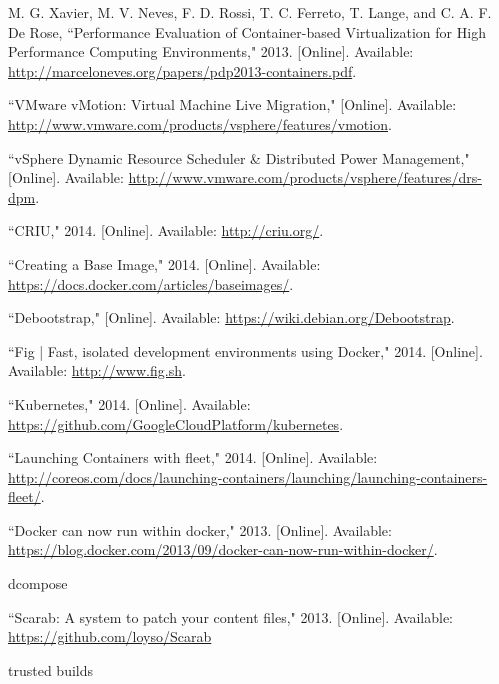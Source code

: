 \begin{thebibliography}{99}
\begin{singlespace}
M. G. Xavier, M. V. Neves, F. D. Rossi, T. C. Ferreto, T. Lange, and C. A. F. De Rose, ``Performance Evaluation of Container-based Virtualization for High Performance Computing Environments," 2013. [Online]. Available: \url{http://marceloneves.org/papers/pdp2013-containers.pdf}.

``VMware vMotion: Virtual Machine Live Migration," [Online]. Available: \url{http://www.vmware.com/products/vsphere/features/vmotion}.

``vSphere Dynamic Resource Scheduler \& Distributed Power Management," [Online]. Available: \url{http://www.vmware.com/products/vsphere/features/drs-dpm}.

``CRIU," 2014. [Online]. Available: \url{http://criu.org/}.

``Creating a Base Image," 2014. [Online]. Available: \url{https://docs.docker.com/articles/baseimages/}.

``Debootstrap," [Online]. Available: \url{https://wiki.debian.org/Debootstrap}.

``Fig | Fast, isolated development environments using Docker," 2014. [Online]. Available: \url{http://www.fig.sh}.

``Kubernetes," 2014. [Online]. Available: \url{https://github.com/GoogleCloudPlatform/kubernetes}.

``Launching Containers with fleet," 2014. [Online]. Available: \url{http://coreos.com/docs/launching-containers/launching/launching-containers-fleet/}.

``Docker can now run within docker," 2013. [Online]. Available: \url{https://blog.docker.com/2013/09/docker-can-now-run-within-docker/}.

dcompose

``Scarab: A system to patch your content files," 2013. [Online]. Available: \url{https://github.com/loyso/Scarab}


trusted builds
\end{singlespace}
\end{thebibliography}
